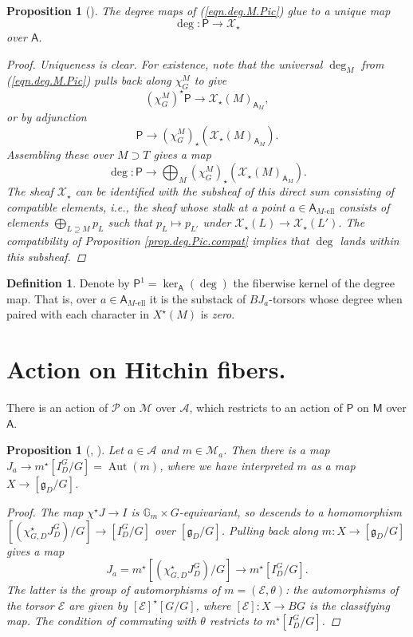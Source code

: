 \documentclass[openany]{amsbook}
\newtheorem{proposition}[theorem]{Proposition}
\theoremstyle{definition}
\newtheorem{definition}[theorem]{Definition}
\theoremstyle{remark}
\numberwithin{equation}{section}
\newcommand{\G}{\mathbb{G}}
\newcommand{\cA}{\mathcal{A}}
\newcommand{\cM}{\mathcal{M}}
\newcommand{\cE}{\mathcal{E}}
\newcommand{\cX}{\mathcal{X}}
\newcommand{\cP}{\mathcal{P}}
\renewcommand{\-}{\operatorname{-}}
\newcommand{\Aut}{\operatorname{Aut}}
\newcommand{\el}{\text{-ell}}
\newcommand{\bM}{\mathsf{M}}
\newcommand{\bA}{\mathsf{A}}
\newcommand{\bAe}[1]{\bA_{#1\el}}
\newcommand{\bP}{\mathsf{P}}
\renewcommand{\fg}{\mathfrak{g}}
\begin{document}
\begin{proposition}[{{\cite[Prop. 6.4.1]{CLII}}}] \label{prop.deg.Pic} The degree maps of (\ref{eqn.deg.M.Pic}) glue to a unique map 
$$
    \deg : \bP \to \cX_\star
$$
over $\bA$.
\begin{proof}
    Uniqueness is clear. For existence, note that the universal $\deg_M$ from (\ref{eqn.deg.M.Pic}) pulls back along $\chi_G^M$ to give
    $$
        (\chi_G^M)^\star \bP \to \cX_\star(M)_{\bA_M},
    $$
    or by adjunction
    $$
        \bP \to (\chi_G^M)_\star (\cX_\star(M)_{\bA_M}).
    $$
    Assembling these over $M \supset T$ gives a map
    $$
        \deg : \bP \to \bigoplus_{M} (\chi_G^M)_\star (\cX_\star(M)_{\bA_M}).
    $$
    The sheaf $\cX_\star$ can be identified with the subsheaf of this direct sum consisting of compatible elements, i.e., the sheaf whose stalk at a point $a \in \bAe{M}$ consists of elements $\bigoplus_{L \supseteq M} p_L$ such that $p_L \mapsto p_{L'}$ under $\cX_\star(L) \to \cX_\star(L')$. The compatibility of Proposition \ref{prop.deg.Pic.compat} implies that $\deg$ lands within this subsheaf.
    
\end{proof}
\end{proposition}


\begin{definition}\label{def.P1}
    Denote by $\bP^{1} = \ker_{\bA}(\deg)$ the fiberwise kernel of the degree map. That is, over $a \in \bAe{M}$ it is the substack of $BJ_a$-torsors whose degree when paired with each character in $X^\star(M)$ is \emph{zero}. 
\end{definition}




\section{Action on Hitchin fibers.}\label{subsect.pic.action.hitchin.fibers}

There is an action of $\cP$ on $\cM$ over $\cA$, which restricts to an action of $\bP$ on $\bM$ over $\bA$.

\begin{proposition}[{{\cite[\S4.3]{ngofl}, \cite[\S5.5]{CLII}}}]
    Let $a \in \cA$ and $m \in \cM_a$. Then there is a map $J_a \to m^\star[I_D^G/G] = \Aut(m)$, where we have interpreted $m$ as a map $X \to [\fg_D/G]$.
    \begin{proof}
        The map $\chi^\star J \to I$ is $\G_m \times G$-equivariant, so descends to a homomorphism $[(\chi^\star_{G,D} J_D^G)/G] \to [I_D^G/G]$ over $[\fg_D/G]$. Pulling back along $m : X \to [\fg_D/G]$ gives a map
        $$
            J_a = m^\star [(\chi_{G,D}^\star J^G_D)/G] \to m^\star [I_D^G/G].
        $$
        The latter is the group of automorphisms of $m = (\cE, \theta)$: the automorphisms of the torsor $\cE$ are given by $[\cE]^\star [G/G]$, where $[\cE] : X \to BG$ is the classifying map. The condition of commuting with $\theta$ restricts to $m^\star [I_D^G/G]$. 
    \end{proof}
\end{proposition}
\end{document}
